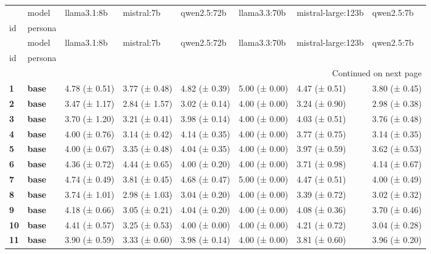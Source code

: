 \begin{longtable}{llllllll}
\toprule
 & model & llama3.1:8b & mistral:7b & qwen2.5:72b & llama3.3:70b & mistral-large:123b & qwen2.5:7b \\
id & persona &  &  &  &  &  &  \\
\midrule
\endfirsthead
\toprule
 & model & llama3.1:8b & mistral:7b & qwen2.5:72b & llama3.3:70b & mistral-large:123b & qwen2.5:7b \\
id & persona &  &  &  &  &  &  \\
\midrule
\endhead
\midrule
\multicolumn{8}{r}{Continued on next page} \\
\midrule
\endfoot
\bottomrule
\endlastfoot
\textbf{1} & \textbf{base} & 4.78 (± 0.51) & 3.77 (± 0.48) & 4.82 (± 0.39) & 5.00 (± 0.00) & 4.47 (± 0.51) & 3.80 (± 0.45) \\
\cline{1-8}
\textbf{2} & \textbf{base} & 3.47 (± 1.17) & 2.84 (± 1.57) & 3.02 (± 0.14) & 4.00 (± 0.00) & 3.24 (± 0.90) & 2.98 (± 0.38) \\
\cline{1-8}
\textbf{3} & \textbf{base} & 3.70 (± 1.20) & 3.21 (± 0.41) & 3.98 (± 0.14) & 4.00 (± 0.00) & 4.03 (± 0.51) & 3.76 (± 0.48) \\
\cline{1-8}
\textbf{4} & \textbf{base} & 4.00 (± 0.76) & 3.14 (± 0.42) & 4.14 (± 0.35) & 4.00 (± 0.00) & 3.77 (± 0.75) & 3.14 (± 0.35) \\
\cline{1-8}
\textbf{5} & \textbf{base} & 4.00 (± 0.67) & 3.35 (± 0.48) & 4.04 (± 0.35) & 4.00 (± 0.00) & 3.97 (± 0.59) & 3.62 (± 0.53) \\
\cline{1-8}
\textbf{6} & \textbf{base} & 4.36 (± 0.72) & 4.44 (± 0.65) & 4.00 (± 0.20) & 4.00 (± 0.00) & 3.71 (± 0.98) & 4.14 (± 0.67) \\
\cline{1-8}
\textbf{7} & \textbf{base} & 4.74 (± 0.49) & 3.81 (± 0.45) & 4.68 (± 0.47) & 5.00 (± 0.00) & 4.47 (± 0.51) & 4.00 (± 0.49) \\
\cline{1-8}
\textbf{8} & \textbf{base} & 3.74 (± 1.01) & 2.98 (± 1.03) & 3.04 (± 0.20) & 4.00 (± 0.00) & 3.39 (± 0.72) & 3.02 (± 0.32) \\
\cline{1-8}
\textbf{9} & \textbf{base} & 4.18 (± 0.66) & 3.05 (± 0.21) & 4.04 (± 0.20) & 4.00 (± 0.00) & 4.08 (± 0.36) & 3.70 (± 0.46) \\
\cline{1-8}
\textbf{10} & \textbf{base} & 4.41 (± 0.57) & 3.25 (± 0.53) & 4.00 (± 0.00) & 4.00 (± 0.00) & 4.21 (± 0.72) & 3.04 (± 0.28) \\
\cline{1-8}
\textbf{11} & \textbf{base} & 3.90 (± 0.59) & 3.33 (± 0.60) & 3.98 (± 0.14) & 4.00 (± 0.00) & 3.81 (± 0.60) & 3.96 (± 0.20) \\

\end{longtable}
